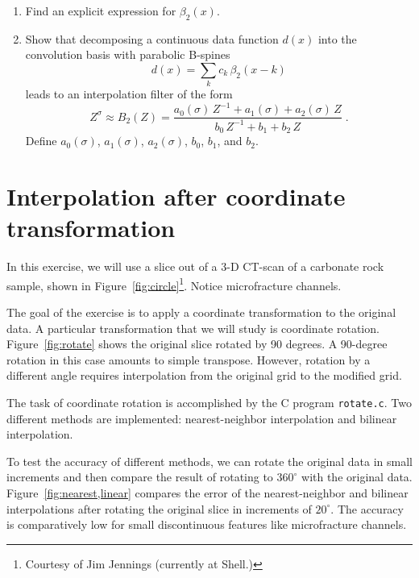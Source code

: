 \begin{enumerate}
\begin{enumerate}
\item Find an explicit expression for $\beta_2(x)$.
\item Show that decomposing a continuous data function $d(x)$ into the convolution basis 
  with parabolic B-spines
  \begin{equation}
    \label{eq:basis} 
    d(x) = \sum\limits_k c_k\,\beta_2(x-k)
  \end{equation}
  leads to an interpolation filter of the form
  \begin{equation}
    \label{eq:bz}
    Z^{\sigma} \approx B_2(Z) = \frac{a_0(\sigma)\,Z^{-1} + a_1(\sigma) + a_2(\sigma)\,Z}{b_0\,Z^{-1} + b_1 + b_2\,Z}\;.
  \end{equation}
  Define $a_0(\sigma)$, $a_1(\sigma)$, $a_2(\sigma)$, $b_0$, $b_1$, and $b_2$.
\end{enumerate}

\end{enumerate}

\section{Interpolation after coordinate transformation}

In this exercise, we will use a slice out of a 3-D CT-scan of a
carbonate rock sample, shown in
Figure~\ref{fig:circle}\footnote{Courtesy of Jim Jennings
  (currently at Shell.)}. Notice microfracture channels.


The goal of the exercise is to apply a coordinate transformation to
the original data. A particular transformation that we will study is
coordinate rotation. Figure~\ref{fig:rotate} shows the original slice
rotated by 90 degrees. A 90-degree rotation in this case amounts to
simple transpose. However, rotation by a different angle requires
interpolation from the original grid to the modified grid.

The task of coordinate rotation is accomplished by the C program
\texttt{rotate.c}. Two different methods are implemented: 
nearest-neighbor interpolation and bilinear interpolation.

To test the accuracy of different methods, we can rotate the original
data in small increments and then compare the result of rotating to
$360^{\circ}$ with the original data. Figure~\ref{fig:nearest,linear}
compares the error of the nearest-neighbor and bilinear interpolations
after rotating the original slice in increments of $20^{\circ}$. The
accuracy is comparatively low for small discontinuous features like
microfracture channels.

